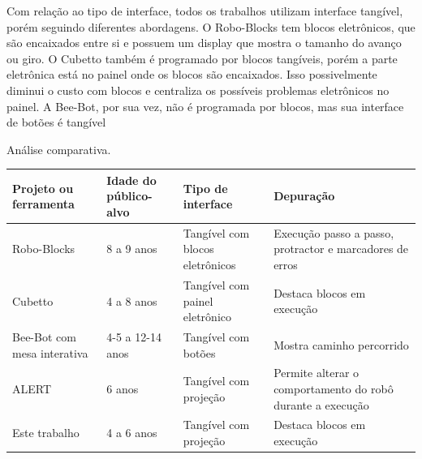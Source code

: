 Com relação ao tipo de interface, todos os trabalhos utilizam interface tangível, porém seguindo diferentes abordagens. O Robo-Blocks tem blocos eletrônicos, que são encaixados entre si e possuem um display que mostra o tamanho do avanço ou giro. O Cubetto também é programado por blocos tangíveis, porém a parte eletrônica está no painel onde os blocos são encaixados. Isso possivelmente diminui o custo com blocos e centraliza os possíveis problemas eletrônicos no painel. A Bee-Bot, por sua vez, não é programada por blocos, mas sua interface de botões é tangível \cite{}


{{\renewcommand{\arraystretch}{1.5}
    \begin{quadro}[!h]
        \caption{Análise comparativa.}
        \vspace{-15pt}
        \begin{tabularx}{\textwidth}{ @{} | p{.2\linewidth} | p{.1\linewidth} | X | X | @{} }
        \hline
        \textbf{Projeto ou ferramenta}  & \textbf{Idade do público-alvo}  & \textbf{Tipo de interface}       &\textbf{Depuração}                                          \\ \hline
        
        Robo-Blocks                     & 8 a 9 anos                      & Tangível com blocos eletrônicos  & Execução passo a passo, protractor e marcadores de erros   \\ \hline
        Cubetto                         & 4 a 8 anos                      & Tangível com painel eletrônico   & Destaca blocos em execução                                 \\ \hline
        Bee-Bot com mesa interativa     & 4-5 a 12-14 anos                & Tangível com botões              & Mostra caminho percorrido                                  \\ \hline
        ALERT                           & 6 anos                          & Tangível com projeção            & Permite alterar o comportamento do robô durante a execução \\ \hline
        Este trabalho                   & 4 a 6 anos                      & Tangível com projeção            & Destaca blocos em execução                                 \\ \hline
        \end{tabularx}
        \vspace{-10ppt}
        \sourceauthor
        \label{quadro:comparision}
    \end{quadro}

}}
